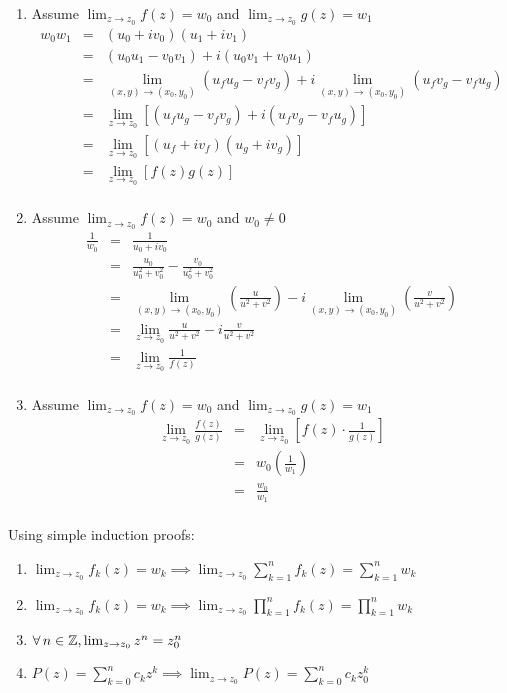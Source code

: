 \documentclass[letterpaper,12pt,fleqn]{article}
\newcommand{\limz}{\lim_{z\to z_0}}
\newcommand{\limxy}{\lim_{(x,y)\to(x_0,y_0)}}
\begin{document}
\begin{theproof}
\begin{enumerate}
  \item Assume $\limz{f(z)}=w_0$ and $\limz{g(z)}=w_1$
    \begin{eqnarray*}
      w_0w_1 &=& (u_0+iv_0)(u_1+iv_1) \\
      &=& (u_0u_1-v_0v_1)+i(u_0v_1+v_0u_1) \\
      &=& \limxy{(u_fu_g-v_fv_g)}+i\limxy{(u_fv_g-v_fu_g)} \\
      &=& \limz{[(u_fu_g-v_fv_g)+i(u_fv_g-v_fu_g)]} \\
      &=& \limz{[(u_f+iv_f)(u_g+iv_g)]} \\
      &=& \limz{[f(z)g(z)]} \\
    \end{eqnarray*}

  \item Assume $\limz{f(z)}=w_0$ and $w_0\ne0$
    \begin{eqnarray*}
      \frac{1}{w_0} &=& \frac{1}{u_0+iv_0} \\
      &=& \frac{u_0}{u_0^2+v_0^2}-\frac{v_0}{u_0^2+v_0^2} \\
      &=& \limxy{\left(\frac{u}{u^2+v^2}\right)}-
      i\limxy{\left(\frac{v}{u^2+v^2}\right)} \\
      &=& \limz{\frac{u}{u^2+v^2}-i\frac{v}{u^2+v^2}} \\
      &=& \limz{\frac{1}{f(z)}} \\
    \end{eqnarray*}

  \item Assume $\limz{f(z)}=w_0$ and $\limz{g(z)}=w_1$
    \begin{eqnarray*}
      \limz{\frac{f(z)}{g(z)}} &=&
      \limz{\left[f(z)\cdot\frac{1}{g(z)}\right]} \\
      &=& w_0\left(\frac{1}{w_1}\right) \\
      &=& \frac{w_0}{w_1} \\
    \end{eqnarray*}
  \end{enumerate}
\end{theproof}

Using simple induction proofs:

\begin{theorem}
  \listbreak
  \begin{enumerate}
    \item $\limz{f_k(z)}=w_k\implies\limz{\sum_{k=1}^n{f_k(z)}}=\sum_{k=1}^n{w_k}$
    \item $\limz{f_k(z)}=w_k\implies\limz{\prod_{k=1}^n{f_k(z)}}=
      \prod_{k=1}^n{w_k}$
    \item $\forall\,n\in\Z,\limz{z^n}=z_0^n$
    \item $P(z)=\sum_{k=0}^n{c_kz^k}\implies\limz{P(z)}=\sum_{k=0}^n{c_kz_0^k}$
  \end{enumerate}
\end{theorem}
\end{document}
